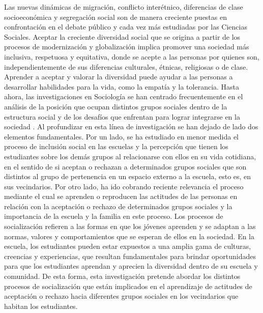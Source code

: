 \documentclass[12pt,twoside]{templates/facsothesis}
\begin{document}
Las nuevas dinámicas de migración, conflicto interétnico, diferencias de clase socioeconómica y segregación social son de manera creciente puestas en confrontación en el debate público y cada vez más estudiadas por las Ciencias Sociales. Aceptar la creciente diversidad social que se origina a partir de los procesos de modernización y globalización implica promover una sociedad más inclusiva, respetuosa y equitativa, donde se acepte a las personas por quienes son, independientemente de sus diferencias culturales, étnicas, religiosas o de clase. Aprender a aceptar y valorar la diversidad puede ayudar a las personas a desarrollar habilidades para la vida, como la empatía y la tolerancia. Hasta ahora, las investigaciones en Sociología se han centrado frecuentemente en el análisis de la posición que ocupan distintos grupos sociales dentro de la estructura social y de los desafíos que enfrentan para lograr integrarse en la sociedad \citep{young_justicia_2000, wade_raza_2000, viverosvigoya_interseccionalidad_2016}. Al profundizar en esta línea de investigación se han dejado de lado dos elementos fundamentales. Por un lado, se ha estudiado en menor medida el proceso de inclusión social en las escuelas \citep{blanco_equidad_2006} y la percepción que tienen los estudiantes sobre los demás grupos al relacionarse con ellos en su vida cotidiana, en el sentido de si aceptan o rechazan a determinados grupos sociales que son distintos al grupo de pertenencia en un espacio externo a la escuela, esto es, en sus vecindarios. Por otro lado, ha ido cobrando reciente relevancia el proceso mediante el cual se aprenden o reproducen las actitudes de las personas en relación con la aceptación o rechazo de determinados grupos sociales y la importancia de la escuela \citep{sandoval-hernandez_teaching_2018, malak-minkiewicz_influences_2021} y la familia \citep{santanderramirez_preferencias_2020, bandura_sociallearning_1969} en este proceso. Los procesos de socialización refieren a las formas en que los jóvenes aprenden y se adaptan a las normas, valores y comportamientos que se esperan de ellos en la sociedad. En la escuela, los estudiantes pueden estar expuestos a una amplia gama de culturas, creencias y experiencias, que resultan fundamentales para brindar oportunidades para que los estudiantes aprendan y aprecien la diversidad dentro de su escuela y comunidad. De esta forma, esta investigación pretende abordar los distintos procesos de socialización que están implicados en el aprendizaje de actitudes de aceptación o rechazo hacia diferentes grupos sociales en los vecindarios que habitan los estudiantes.
\end{document}
